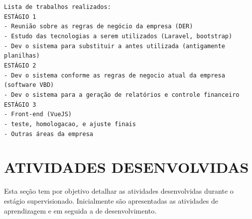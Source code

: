 \documentclass[
  12pt,				%
  openany,
  oneside,
  a4paper,			%
  english,			%
  brazil
]{article}
\numberwithin{figure}{section}
\numberwithin{table}{section}
\begin{document}
%
%
%
%
%
%



\noindent \texttt{Lista de trabalhos realizados:\\
  ESTÁGIO 1 \\
  - Reunião sobre as regras de negócio da empresa (DER) \\
  - Estudo das tecnologias a serem utilizados (Laravel, bootstrap) \\
  - Dev o sistema para substituir a antes utilizada (antigamente planilhas) \\
  ESTÁGIO 2 \\
  - Dev o sistema conforme as regras de negocio atual da empresa (software VBD) \\
  - Dev o sistema para a geração de relatórios e controle financeiro \\
  ESTÁGIO 3 \\
  - Front-end (VueJS) \\
  - teste, homologacao, e ajuste finais \\
  - Outras áreas da empresa
}

\clearpage



\section{ATIVIDADES DESENVOLVIDAS}


Esta seção tem por objetivo detalhar as atividades desenvolvidas durante o estágio supervisionado. Inicialmente são apresentadas as atividades de aprendizagem e em seguida a de desenvolvimento.
\end{document}
